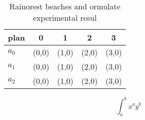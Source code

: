 \documentclass[a4paper]{article}
\begin{document}
\begin{table}
\begin{adjustbox}{width=0.5\columnwidth}
\begin{tabular}{|l|l|l|l|l|}
\hline
\textbf{plan} & \multicolumn{1}{c|}{\textbf{0}} & \multicolumn{1}{c|}{\textbf{1}} & \multicolumn{1}{c|}{\textbf{2}} & \multicolumn{1}{c|}{\textbf{3}} \\ \hline
\textbf{$a_0$}  & (0,0) & (1,0) & (2,0) & (3,0) \\ \hline
\textbf{$a_1$}  & (0,0) & (1,0) & (2,0) & (3,0) \\ \hline
\textbf{$a_2$}  & (0,0) & (1,0) & (2,0) & (3,0) \\ \hline
\end{tabular}
\end{adjustbox}
\caption{Rainorest beaches and ormulate experimental resul
}
\end{table}

\[ \int_{a}^{b}{x^{a}y^{b}} \]
\end{document}
